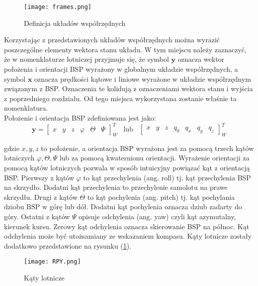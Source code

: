 \begin{figure}[!h]
   	\centering
      	\texttt{[image: frames.png]}
      	\caption{Definicja układów współrzędnych}
\end{figure}

Korzystając z przedstawionych układów współrzędnych można wyrazić poszczególne elementy wektora stanu układu. W tym miejscu należy zaznaczyć, że w nomenklaturze lotniczej przyjmuje się, że symbol $\bm{y}$ oznacza wektor położenia i orientacji BSP wyrażony w globalnym układzie współrzędnych, a symbol $\bm{x}$ oznacza prędkości kątowe i liniowe wyrażone w układzie współrzędnym związanym z BSP. Oznaczenia te kolidują z oznaczeniami wektora stanu i wyjścia z poprzedniego rozdziału. Od tego miejsca wykorzystana zostanie właśnie ta nomenklatura.\\

Położenie i orientacja BSP zdefiniowana jest jako:
\[
	      		 \bm{y} = \begin{bmatrix}x & y &  z & \varphi & \Theta & \Psi  \end{bmatrix}^{T}_{W} \hspace{10pt} \text{lub} \hspace{10pt} \begin{bmatrix}x & y & z & q_0 &  q_x &  q_y & q_z  \end{bmatrix}^{T}_{W}
\]

gdzie $x, y, z$ to położenie, a orientacja BSP wyrażona jest za pomocą trzech kątów lotniczych $\varphi, \Theta,  \Psi$ lub za pomocą kwaternionu orientacji. Wyrażenie orientacji za pomocą kątów lotniczych pozwala w sposób intuicyjny powiązać kąt z orientacją BSP. Pierwszy z kątów $\varphi$ to kąt przechylenia (ang. roll) tj. kąt przechylenia BSP na skrzydło. Dodatni kąt przechylenia to przechylenie samolotu na prawe skrzydłu. Drugi z kątów $\Theta$ to kąt pochylenia (ang. pitch) tj. kąt pochylania dziobu BSP w górę lub dół. Dodatni kąt pochylenia oznacza dziub zadarty do góry. Ostatni z kątów $\Psi$ opisuje odchylenia (ang. yaw) czyli kąt azymutalny, kierunek kursu. Zerowy kąt odchylenia oznacza skierowanie BSP na północ. Kąt odchylenia może być utożsamiany ze wskazaniem kompasu. Kąty lotnicze zostały dodatkowo przedstawione na rysunku (\ref{RPY}).

\begin{figure}[!h]
   	\centering
      	\texttt{[image: RPY.png]}
      	\caption{Kąty lotnicze}
      	\label{RPY}
\end{figure}

